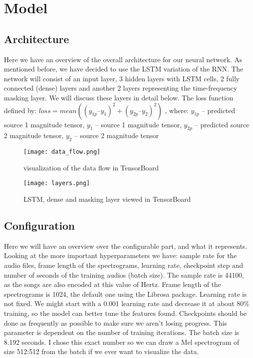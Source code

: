 \documentclass[../Thesis.tex]{subfiles}
\begin{document}
\section {Model}
\subsection {Architecture}

Here we have an overview of the overall architecture for our neural network. As mentioned before, we have decided to use the LSTM variation of the RNN. The network will consist of an input layer, 3 hidden layers with LSTM cells, 2 fully connected (dense) layers and another 2 layers representing the time-frequency masking layer. We will discuss these layers in detail below.
The loss function defined by:  $\mathit{loss} = \mathit{mean}( {( \mathit{y}_{1\mathit{p}} – \mathit{y}_1 )}_{}^2 + {( \mathit{y}_{2\mathit{p}} – \mathit{y}_2 )}_{}^2)$ , 
where: $ \mathit{y}_{1\mathit{p}} $ – predicted source 1 magnitude tensor, $ \mathit{y}_{1} $ – source 1 magnitude tensor, $ \mathit{y}_{2\mathit{p}} $ – predicted source 2 magnitude tensor, $ \mathit{y}_{2} $ – source 2 magnitude tensor 

\begin{figure}[h]
\centering
\label {fig: data_flow}
\texttt{[image: data\_flow.png]}
\caption[width=0.5\textwidth]{visualization of the data flow in TensorBoard}
\end{figure}

\begin{figure}[h]
\centering
\label {fig: layers}
\texttt{[image: layers.png]}
\caption[width=0.5\textwidth]{LSTM, dense and masking layer viewed in TensorBoard}
\end{figure}

\subsection {Configuration}

Here we will have an overview over the configurable part, and what it represents. Looking at the more important hyperparameters we have: sample rate for the audio files, frame length of the spectrograms, learning rate, checkpoint step and number of seconds of the training audios (batch size). The sample rate is 44100, as the songs are also encoded at this value of Hertz. Frame length of the spectrograms is 1024, the default one using the Librosa package. Learning rate is not fixed. We might start with a 0.001 learning rate and decrease it at about 80\% training, so the model can better tune the features found. Checkpoints should be done as frequently as possible to make sure we aren’t losing progress. This parameter is dependent on the number of training iterations. The batch size is 8.192 seconds. I chose this exact number so we can draw a Mel spectrogram of size 512:512 from the batch if we ever want to visualize the data.
\end{document}
